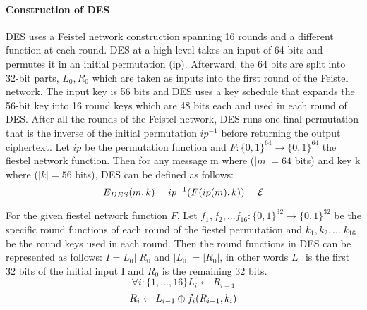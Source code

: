 
\paragraph{Construction of DES}
DES uses a Feistel network construction spanning 16 rounds and a different function at each round. DES at a high level takes an input of 64 bits and permutes it in an initial permutation (ip). Afterward, the 64 bits are split into 32-bit parts, \( L_0, R_0\) which are taken as inputs into the first round of the Feistel network. The input key is 56 bits and DES uses a key schedule that expands the 56-bit key into 16 round keys which are 48 bits each and used in each round of DES. After all the rounds of the Feistel network, DES runs one final permutation that is the inverse of the initial permutation $ip^{-1}$ before returning the output ciphertext.
\indent Let $ip$ be the permutation function and $F : \{0,1\}^{64} \to \{0,1\}^{64}$ the fiestel network function. Then for any message m where (\( |m| = 64 \) bits) and key k where (\( |k| = 56 \) bits), DES can be defined as follows:
	\[ {E}_{DES} (m,k) = {ip}^{-1}(F({ip}(m), k)) = {\cal E} \] 


\indent For the given fiestel network function $F$, Let $f_1, f_2, ... f_{16} : \{0,1\}^{32} \to \{0,1\}^{32}$ be the specific round functions of each round of the fiestel permutation and \(k_1, k_2, .... k_16 \) be the round keys used in each round. Then the round functions in DES can be represented as follows: \newline
\( I = L_0 || R_0 \)  and \(|L_0| = |R_0|\), in other words $L_0$ is the first 32 bits of the initial input I and $R_0$ is the remaining 32 bits.  \newline
\[\forall i : \{ 1, ..., 16 \} L_i \leftarrow R_{i-1} \] \[ R_i \leftarrow L_{i-1} {\:\oplus\:} {f_i}(R_{i-1}, k_i) \]


